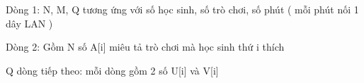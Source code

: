 Dòng 1: N, M, Q tương ứng với số học sinh, số trò chơi, số phút ( mỗi phút nối 1 dây LAN )


Dòng 2: Gồm N số A[i] miêu tả trò chơi mà học sinh thứ i thích


Q dòng tiếp theo: mỗi dòng gồm 2 số U[i] và V[i]